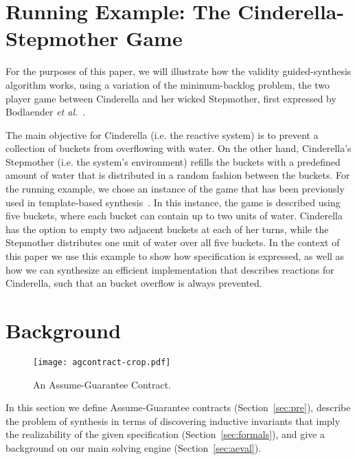 \section{Running Example: The Cinderella-Stepmother Game}
\label{sec:example}

For the purposes of this paper, we will illustrate how the validity
guided-synthesis algorithm works, using a variation of the minimum-backlog
problem, the two player game between Cinderella and her wicked
Stepmother, first  expressed by Bodlaender \textit{et
al.}~\cite{bodlaender2012cinderella}.

The main objective for Cinderella (i.e. the reactive system) is to prevent a
collection of buckets from overflowing with water. On the other hand,
Cinderella's Stepmother (i.e. the system's environment) refills the buckets with a predefined amount of water that is distributed in a random fashion between the buckets.
For the running example, we chose an instance of the game that has been
previously used in template-based synthesis~\cite{beyene2014constraint}. In this instance, the game is described
using five buckets, where each bucket can contain up to two units of water.
Cinderella has the option to empty two adjacent buckets at each of her turns,
while the Stepmother distributes one unit of water over all five buckets. In the context of this paper we use this example to show how specification is expressed, as well as how we can synthesize an efficient implementation that describes reactions for Cinderella, such that an bucket overflow is always prevented.



\section{Background}
\label{sec:background}

\begin{figure}[!t]
\centering
\texttt{[image: agcontract-crop.pdf]}
\caption{An Assume-Guarantee Contract.}
\label{fg:agcontract}
\end{figure}


In this section we define Assume-Guarantee contracts (Section~\ref{sec:pre}),
describe the problem of synthesis in terms of discovering inductive invariants that imply the realizability of the given specification (Section~\ref{sec:formals}), and give a background on our main solving engine (Section~\ref{sec:aeval}).


